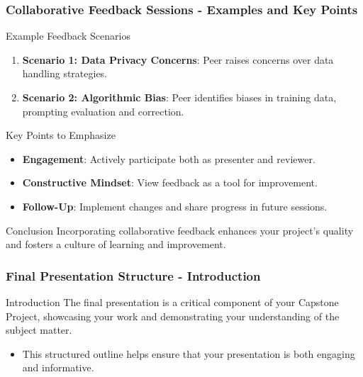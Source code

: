 \documentclass[aspectratio=169]{beamer}
\begin{document}
\begin{frame}[fragile]
    \frametitle{Collaborative Feedback Sessions - Examples and Key Points}
    \begin{block}{Example Feedback Scenarios}
        \begin{enumerate}
            \item \textbf{Scenario 1: Data Privacy Concerns}: Peer raises concerns over data handling strategies.
            \item \textbf{Scenario 2: Algorithmic Bias}: Peer identifies biases in training data, prompting evaluation and correction.
        \end{enumerate}
    \end{block}

    \begin{block}{Key Points to Emphasize}
        \begin{itemize}
            \item \textbf{Engagement}: Actively participate both as presenter and reviewer.
            \item \textbf{Constructive Mindset}: View feedback as a tool for improvement.
            \item \textbf{Follow-Up}: Implement changes and share progress in future sessions.
        \end{itemize}
    \end{block}
    
    \begin{block}{Conclusion}
        Incorporating collaborative feedback enhances your project's quality and fosters a culture of learning and improvement.
    \end{block}
\end{frame}

\begin{frame}[fragile]
    \frametitle{Final Presentation Structure - Introduction}
    \begin{block}{Introduction}
        The final presentation is a critical component of your Capstone Project, showcasing your work and demonstrating your understanding of the subject matter. 
    \end{block}
    
    \begin{itemize}
        \item This structured outline helps ensure that your presentation is both engaging and informative.
    \end{itemize}
\end{frame}
\end{document}
